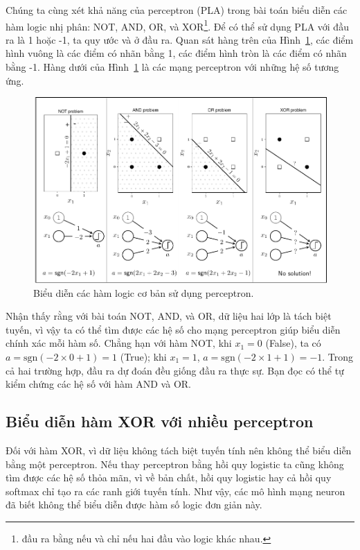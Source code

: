 Chúng ta cùng xét khả năng của perceptron (PLA) trong bài toán biểu
diễn các hàm logic nhị phân: NOT, AND, OR, và XOR\footnote{đầu ra bằng 
nếu và chỉ nếu hai đầu vào logic khác nhau.}. Để có thể sử dụng PLA với
đầu ra là 1 hoặc -1, ta quy ước  và  ở đầu ra. Quan sát hàng trên của Hình~\ref{fig:14_1}, các điểm
hình vuông là các điểm có nhãn bằng 1, các điểm hình tròn là các
điểm có nhãn bằng -1. Hàng dưới của Hình~\ref{fig:14_1} là các mạng
perceptron với những hệ số tương ứng.
\begin{figure}[t]
 \vspace{.1in}
\centering
    \includegraphics[width = \textwidth]{Chapters/05_NeuralNetworks/14_mlp/latex/logic_nn.pdf}
    \caption[]{Biểu diễn các hàm logic cơ bản sử dụng perceptron.}
    \label{fig:14_1}
\end{figure}
Nhận thấy rằng với bài toán NOT, AND, và OR, dữ liệu hai lớp là tách biệt tuyến, vì vậy ta có thể tìm được các hệ số cho mạng perceptron giúp biểu diễn
chính xác mỗi hàm số. Chẳng hạn với hàm NOT, khi $x_1 = 0$ (False), ta có $a =
\text{sgn}(-2 \times 0+1) = 1$ (True); khi $x_1 = 1$, $a = \text{sgn}(-2\times 1 + 1) =
-1$. Trong cả hai trường hợp, đầu ra dự đoán đều giống đầu ra thực sự. Bạn
đọc có thể tự kiểm chứng các hệ số với hàm AND và OR.

\subsection{Biểu diễn hàm XOR với nhiều perceptron}
Đối với hàm XOR, vì dữ liệu không tách biệt tuyến tính nên không thể biểu diễn
bằng một perceptron. Nếu thay perceptron bằng hồi quy logistic ta cũng không tìm
được các hệ số thỏa mãn, vì về bản chất, hồi quy logistic hay cả hồi quy softmax
chỉ tạo ra các ranh giới tuyến tính. Như vậy, các mô hình mạng neuron đã biết
không thể biểu diễn được hàm số logic đơn giản này.
 
